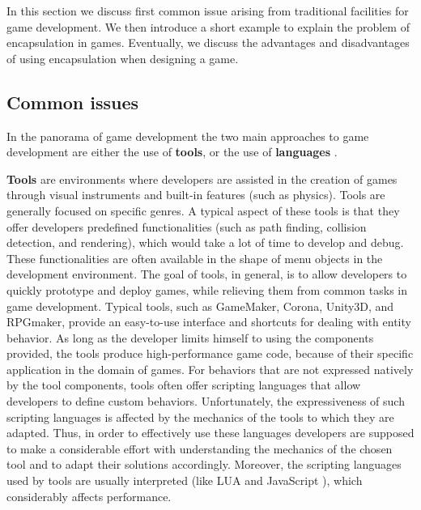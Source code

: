 In this section we discuss first common issue arising from traditional facilities for game development. We then introduce a short example to explain the problem of encapsulation in games. Eventually, we discuss the advantages and disadvantages of using encapsulation when designing a game.

\subsection{Common issues}
\label{Common issues}
In the panorama of game development the two main approaches to game development are either the use of \textbf{tools}, or the use of \textbf{languages} \cite{maggiore2013casanova}.

\textbf{Tools} are environments where developers are assisted in the creation of games through visual instruments and built-in features (such as physics). Tools are generally focused on specific genres. A typical aspect of these tools is that they offer developers predefined functionalities (such as path finding, collision detection, and rendering), which would take a lot of time to develop and debug. These functionalities are often available in the shape of menu objects in the development environment. The goal of tools, in general, is to allow developers to quickly prototype and deploy games, while relieving them from common tasks in game development. Typical tools, such as GameMaker, Corona, Unity3D, and RPGmaker, provide an easy-to-use interface and shortcuts for dealing with entity behavior. As long as the developer limits himself to using the components provided, the tools produce high-performance game code, because of their specific application in the domain of games. For behaviors that are not expressed natively by the tool components, tools often offer scripting languages that allow developers to define custom behaviors. Unfortunately, the expressiveness of such scripting languages is affected by the mechanics of the tools to which they are adapted. Thus, in order to effectively use these languages developers are supposed to make a considerable effort with understanding the mechanics of the chosen tool and to adapt their solutions accordingly. Moreover, the scripting languages used by tools are usually interpreted (like LUA and JavaScript \cite{anderson2011classification}), which considerably affects performance.

